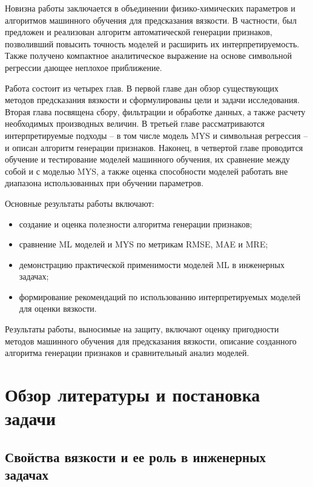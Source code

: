 \documentclass[a4paper,12pt]{article}
\begin{document}
  Новизна работы заключается в объединении физико-химических параметров и алгоритмов машинного обучения для предсказания вязкости. В частности, был предложен и реализован алгоритм автоматической генерации признаков, позволивший повысить точность моделей и расширить их интерпретируемость. Также получено компактное аналитическое выражение на основе символьной регрессии дающее неплохое приближение.

  Работа состоит из четырех глав. В первой главе дан обзор существующих методов предсказания вязкости и сформулированы цели и задачи исследования. Вторая глава посвящена сбору, фильтрации и обработке данных, а также расчету необходимых производных величин. В третьей главе рассматриваются интерпретируемые подходы -- в том числе модель MYS и символьная регрессия -- и описан алгоритм генерации признаков. Наконец, в четвертой главе проводится обучение и тестирование моделей машинного обучения, их сравнение между собой и с моделью MYS, а также оценка способности моделей работать вне диапазона использованных при обучении параметров.

  Основные результаты работы включают:
  \begin{itemize}
    \item создание и оценка полезности алгоритма генерации признаков;
    \item сравнение ML моделей и MYS по метрикам RMSE, MAE и MRE;
    \item демонстрацию практической применимости моделей ML в инженерных задачах;
    \item формирование рекомендаций по использованию интерпретируемых моделей для оценки вязкости.
  \end{itemize}

  Результаты работы, выносимые на защиту, включают оценку пригодности методов машинного обучения для предсказания вязкости, описание созданного алгоритма генерации признаков и сравнительный анализ моделей.

\section{Обзор литературы и постановка задачи}
  \subsection{Свойства вязкости и ее роль в инженерных задачах}
\end{document}
